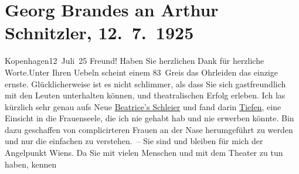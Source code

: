 

         
         \newcommand{\erwaehntePersonen}{Personen:  ?? [Schuldirektor von Georg Brandes]}
         \newcommand{\erwaehnteOrte}{Orte: Kopenhagen, Wien}
         \newcommand{\erwaehnteWerke}{Werke: Der Schleier der Beatrice. Schauspiel in fünf Akten}
               \section[Georg Brandes an Arthur Schnitzler, 12. 7. 1925]{ Georg Brandes an Arthur Schnitzler, 12. 7. 1925}\nopagebreak{}\rehead{ }\begin{ledgroupsized}[t]{13cm}\normalsize\beginnumbering \toendnotes[C]{\smallbreak\pagebreak[2]} 
\toendnotes[C]{\smallbreak}\pstart
           \raggedleft{}{\pb}Kopenhagen12 Juli 25\pend
           \pstart
           Freund! Haben Sie herzlichen Dank für herzliche Worte.\hspace*{2em}Unter Ihren Uebeln scheint einem 83 Greis das Ohrleiden
               das einzige ernste. Glücklicherweise ist es nicht schlimmer, als dass Sie sich
               gastfreundlich mit den Leuten unterhalten können, und theatralischen Erfolg erleben.
               Ich las kürzlich sehr genau aufs Neue \uline{Beatrice’s Schleier} und fand darin \uline{Tiefen}, eine Einsicht in die
               Frauenseele, die ich nie gehabt hab und nie erwerben könnte. Bin dazu geschaffen von
               complicirteren Frauen an der Nase herumgeführt zu werden und nur die einfachen zu
               verstehen. – Sie sind und bleiben für mich der Angelpunkt Wiens. Da Sie mit vielen Menschen und mit dem Theater zu tun haben, kennen

\end{ledgroupsized}
